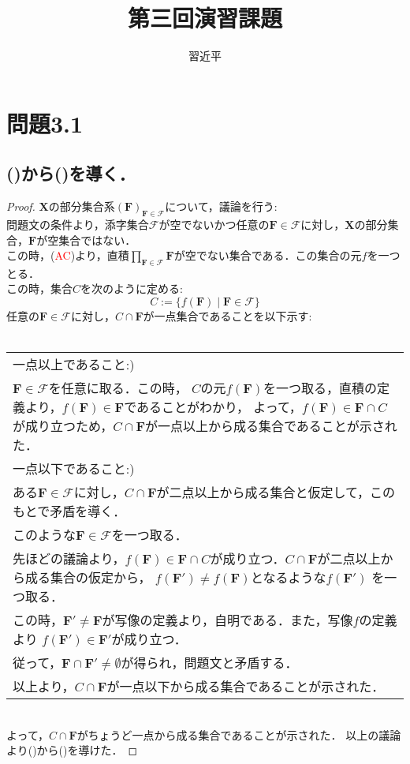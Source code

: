 \documentclass{jarticle}
\begin{document}
\title{第三回演習課題}
\author{習近平}
\maketitle

\section{問題3.1}
\subsection{()から()を導く．}
\begin{proof}
$\mathbf{X}$の部分集合系$(\mathbf{F})_{\mathbf{F} \in \mathcal{F}}$について，議論を行う:\\
問題文の条件より，添字集合$\mathcal{F}$が空でないかつ任意の$\mathbf{F} \in \mathcal{F}$に対し，$\mathbf{X}$の部分集合，$\mathbf{F}$が空集合ではない．\\
この時，(\textcolor{red}{AC})より，直積$\prod\limits_{\mathbf{F} \in \mathcal{F}} \mathbf{F}$が空でない集合である．この集合の元$f$を一つとる．\\
この時，集合$C$を次のように定める:\\
$$
C:= \{f(\mathbf{F}) \mid  \mathbf{F} \in \mathcal{F} \}
$$
任意の$\mathbf{F} \in \mathcal{F}$に対し，$C \cap \mathbf{F} $が一点集合であることを以下示す:\\
\\
	\begin{tabular}{|p{11cm}|}
		\hline
一点以上であること:)\\
$\mathbf{F} \in \mathcal{F}$を任意に取る．この時，
	$C$の元$f(\mathbf{F})$を一つ取る，直積の定義より，$f(\mathbf{F}) \in \mathbf{F}$であることがわかり，
	よって，$f(\mathbf{F}) \in \mathbf{F} \cap C$が成り立つため，$ C \cap \mathbf{F}$が一点以上から成る集合であることが示された．\\
	\hline
一点以下であること:)\\
ある$\mathbf{F} \in \mathcal{F}$に対し，$ C \cap \mathbf{F}$が二点以上から成る集合と仮定して，このもとで矛盾を導く．\\
このような$\mathbf{F} \in \mathcal{F}$を一つ取る．\\
	先ほどの議論より，$f(\mathbf{F}) \in \mathbf{F} \cap C$が成り立つ．$ C \cap \mathbf{F}$が二点以上から成る集合の仮定から，
	$f(\mathbf{F}') \neq f(\mathbf{F})$となるような$f(\mathbf{F}')$ を一つ取る．\\
	この時，$\mathbf{F}' \neq \mathbf{F}$が写像の定義より，自明である．また，写像$f$の定義より
	$f(\mathbf{F}') \in \mathbf{F}'$が成り立つ．\\
	従って，$\mathbf{F} \cap \mathbf{F}' \neq \emptyset$が得られ，問題文と矛盾する．\\
	以上より，$ C \cap \mathbf{F}$が一点以下から成る集合であることが示された．\\
	\hline
	\end{tabular}
\noindent \\
よって，$ C \cap \mathbf{F}$がちょうど一点から成る集合であることが示された．
以上の議論より()から()を導けた．
\end{proof}
\end{document}
